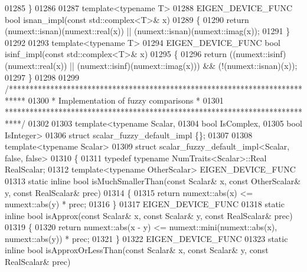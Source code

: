 \begin{DoxyCode}
01285 \}
01286 
01287 \textcolor{keyword}{template}<\textcolor{keyword}{typename} T>
01288 EIGEN\_DEVICE\_FUNC \textcolor{keywordtype}{bool} isnan\_impl(\textcolor{keyword}{const} std::complex<T>& x)
01289 \{
01290   \textcolor{keywordflow}{return} (numext::isnan)(numext::real(x)) || (numext::isnan)(numext::imag(x));
01291 \}
01292 
01293 \textcolor{keyword}{template}<\textcolor{keyword}{typename} T>
01294 EIGEN\_DEVICE\_FUNC \textcolor{keywordtype}{bool} isinf\_impl(\textcolor{keyword}{const} std::complex<T>& x)
01295 \{
01296   \textcolor{keywordflow}{return} ((numext::isinf)(numext::real(x)) || (numext::isinf)(numext::imag(x))) && (!(numext::isnan)(x));
01297 \}
01298 
01299 \textcolor{comment}{/****************************************************************************}
01300 \textcolor{comment}{* Implementation of fuzzy comparisons                                       *}
01301 \textcolor{comment}{****************************************************************************/}
01302 
01303 \textcolor{keyword}{template}<\textcolor{keyword}{typename} Scalar,
01304          \textcolor{keywordtype}{bool} IsComplex,
01305          \textcolor{keywordtype}{bool} IsInteger>
01306 \textcolor{keyword}{struct }scalar\_fuzzy\_default\_impl \{\};
01307 
01308 \textcolor{keyword}{template}<\textcolor{keyword}{typename} Scalar>
01309 \textcolor{keyword}{struct }scalar\_fuzzy\_default\_impl<Scalar, false, false>
01310 \{
01311   \textcolor{keyword}{typedef} \textcolor{keyword}{typename} NumTraits<Scalar>::Real RealScalar;
01312   \textcolor{keyword}{template}<\textcolor{keyword}{typename} OtherScalar> EIGEN\_DEVICE\_FUNC
01313   \textcolor{keyword}{static} \textcolor{keyword}{inline} \textcolor{keywordtype}{bool} isMuchSmallerThan(\textcolor{keyword}{const} Scalar& x, \textcolor{keyword}{const} OtherScalar& y, \textcolor{keyword}{const} RealScalar& prec)
01314   \{
01315     \textcolor{keywordflow}{return} numext::abs(x) <= numext::abs(y) * prec;
01316   \}
01317   EIGEN\_DEVICE\_FUNC
01318   \textcolor{keyword}{static} \textcolor{keyword}{inline} \textcolor{keywordtype}{bool} isApprox(\textcolor{keyword}{const} Scalar& x, \textcolor{keyword}{const} Scalar& y, \textcolor{keyword}{const} RealScalar& prec)
01319   \{
01320     \textcolor{keywordflow}{return} numext::abs(x - y) <= numext::mini(numext::abs(x), numext::abs(y)) * prec;
01321   \}
01322   EIGEN\_DEVICE\_FUNC
01323   \textcolor{keyword}{static} \textcolor{keyword}{inline} \textcolor{keywordtype}{bool} isApproxOrLessThan(\textcolor{keyword}{const} Scalar& x, \textcolor{keyword}{const} Scalar& y, \textcolor{keyword}{const} RealScalar& prec)

\end{DoxyCode}

